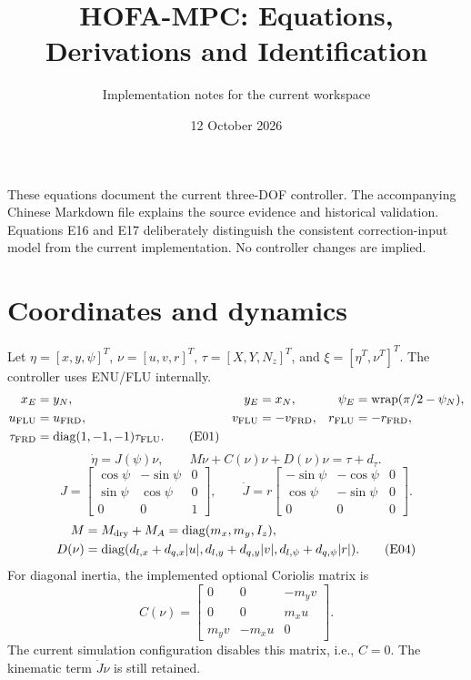 \documentclass[11pt,a4paper]{article}
\title{HOFA-MPC: Equations, Derivations and Identification}
\author{Implementation notes for the current workspace}
\date{12 October 2026}
\newcommand{\wrap}{\operatorname{wrap}}
\newcommand{\diag}{\operatorname{diag}}
\begin{document}
\maketitle
These equations document the current three-DOF controller. The accompanying
Chinese Markdown file explains the source evidence and historical validation.
Equations E16 and E17 deliberately distinguish the consistent correction-input
model from the current implementation. No controller changes are implied.

\section{Coordinates and dynamics}
Let $\eta=[x,y,\psi]^T$, $\nu=[u,v,r]^T$, $\tau=[X,Y,N_z]^T$,
and $\xi=[\eta^T,\nu^T]^T$. The controller uses ENU/FLU internally.
\begin{align}
x_E&=y_N,&y_E&=x_N,&\psi_E&=\wrap(\pi/2-\psi_N),\notag\\
u_{\mathrm{FLU}}&=u_{\mathrm{FRD}},&v_{\mathrm{FLU}}&=-v_{\mathrm{FRD}},&
r_{\mathrm{FLU}}&=-r_{\mathrm{FRD}},\notag\\
\tau_{\mathrm{FRD}}&=\diag(1,-1,-1)\tau_{\mathrm{FLU}}.\tag{E01}
\end{align}
\begin{equation}
\dot\eta=J(\psi)\nu,\qquad
M\dot\nu+C(\nu)\nu+D(\nu)\nu=\tau+d_\tau.\tag{E02}
\end{equation}
\begin{equation}
J=\begin{bmatrix}\cos\psi&-\sin\psi&0\\\sin\psi&\cos\psi&0\\0&0&1\end{bmatrix},\qquad
\dot J=r\begin{bmatrix}-\sin\psi&-\cos\psi&0\\\cos\psi&-\sin\psi&0\\0&0&0\end{bmatrix}.
\tag{E03}
\end{equation}
\begin{align}
M&=M_{\mathrm{dry}}+M_A=\diag(m_x,m_y,I_z),\notag\\
D(\nu)&=\diag(d_{l,x}+d_{q,x}|u|,d_{l,y}+d_{q,y}|v|,d_{l,\psi}+d_{q,\psi}|r|).
\tag{E04}
\end{align}
For diagonal inertia, the implemented optional Coriolis matrix is
\begin{equation}
C(\nu)=\begin{bmatrix}0&0&-m_yv\\0&0&m_xu\\m_yv&-m_xu&0\end{bmatrix}.
\tag{E05}
\end{equation}
The current simulation configuration disables this matrix, i.e., $C=0$.
The kinematic term $\dot J\nu$ is still retained.
\end{document}
